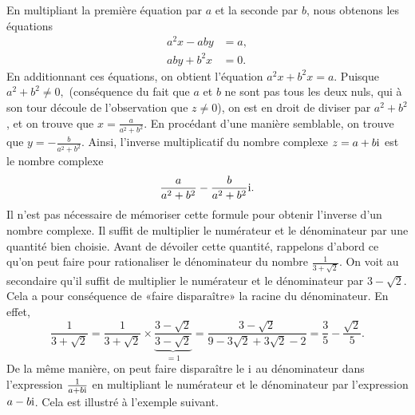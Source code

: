 \documentclass[
  letterpaper,
  DIV=11,
  numbers=noendperiod,
  oneside]{scrreprt}
\theoremstyle{definition}
\theoremstyle{remark}
\begin{document}
En multipliant la première équation par \(a\) et la seconde par \(b\),
nous obtenons les équations \begin{align}
a^2x-aby&=a,\label{eqn:reelle2}\\
aby+b^2x&=0.\label{eqn:imaginaire2}
\end{align} En additionnant ces équations, on obtient l'équation
\(a^2x+b^2x=a\). Puisque \(a^2+b^2\neq 0,\) (conséquence du fait que
\(a\) et \(b\) ne sont pas tous les deux nuls, qui à son tour découle de
l'observation que \(z\neq 0\)), on est en droit de diviser par
\(a^2+b^2\), et on trouve que \(x=\frac{a}{a^2+b^2}\). En procédant
d'une manière semblable, on trouve que \(y=-\frac{b}{a^2+b^2}\). Ainsi,
l'inverse multiplicatif du nombre complexe \(z=a+b\textrm{i}\) est le nombre
complexe \[\frac{a}{a^2+b^2}-\frac{b}{a^2+b^2}\textrm{i}.\] Il n'est pas
nécessaire de mémoriser cette formule pour obtenir l'inverse d'un nombre
complexe. Il suffit de multiplier le numérateur et le dénominateur par
une quantité bien choisie. Avant de dévoiler cette quantité, rappelons
d'abord ce qu'on peut faire pour rationaliser le dénominateur du nombre
\(\frac{1}{3+\sqrt{2}}\). On voit au secondaire qu'il suffit de
multiplier le numérateur et le dénominateur par \(3-\sqrt{2}\). Cela a
pour conséquence de «faire disparaître» la racine du dénominateur. En
effet,
\[\frac{1}{3+\sqrt{2}}=\frac{1}{3+\sqrt{2}}\times\underbrace{\frac{3-\sqrt{2}}{3-\sqrt{2}}}_{=1}=\frac{3-\sqrt{2}}{9-3\sqrt{2}+3\sqrt{2}-2}=\frac{3}{5}-\frac{\sqrt{2}}{5}.\]
De la même manière, on peut faire disparaître le \(\textrm{i}\) au dénominateur
dans l'expression \(\frac{1}{a+b\textrm{i}}\) en multipliant le numérateur et
le dénominateur par l'expression \(a-b\textrm{i}\). Cela est illustré à
l'exemple suivant.

\end{document}
